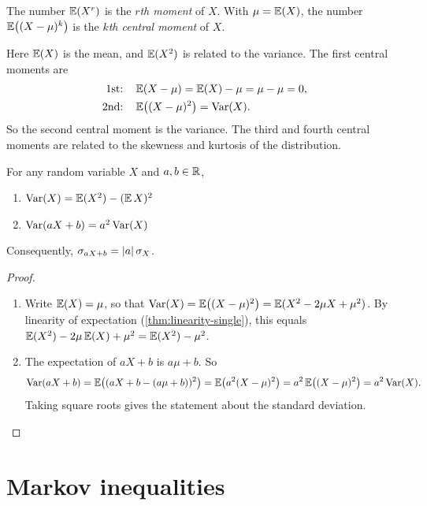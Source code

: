 \begin{definition}[Moments]\label{def:moments}
The number $\operatorname{\mathbb{E}}(X^r)$ is the \emph{$r$th moment} of $X$. With $\mu = \operatorname{\mathbb{E}}(X)$, the number $\operatorname{\mathbb{E}}\bigl((X - \mu)^k\bigr)$ is the \emph{$k$th central moment} of $X$.
\end{definition}

Here $\operatorname{\mathbb{E}}(X)$ is the mean, and $\operatorname{\mathbb{E}}(X^2)$ is related to the variance. The first central moments are
\begin{align*}
  \text{1st:} \quad & \operatorname{\mathbb{E}}(X - \mu) = \operatorname{\mathbb{E}}(X) - \mu = \mu - \mu = 0, \\
  \text{2nd:} \quad & \operatorname{\mathbb{E}}\bigl((X - \mu)^2\bigr) = \operatorname{Var}(X).
\end{align*}
So the second central moment is the variance. The third and fourth central moments are related to the skewness and kurtosis of the distribution.

\begin{theorem}\label{thm:variance-properties}
For any random variable $X$ and $a, b \in \mathbb{R}$,
\begin{enumerate}
  \item $\operatorname{Var}(X) = \operatorname{\mathbb{E}}(X^2) - (\operatorname{\mathbb{E}} X)^2$
  \item $\operatorname{Var}(aX + b) = a^2 \operatorname{Var}(X)$
\end{enumerate}
Consequently, $\sigma_{aX + b} = \lvert a\rvert\,\sigma_X$.
\end{theorem}

\begin{proof}\leavevmode
\begin{enumerate}[leftmargin=*]
  \item[1.] Write $\operatorname{\mathbb{E}}(X) = \mu$, so that $\operatorname{Var}(X) = \operatorname{\mathbb{E}}\bigl((X - \mu)^2\bigr) = \operatorname{\mathbb{E}}(X^2 - 2\mu X + \mu^2)$. By linearity of expectation (\cref{thm:linearity-single}), this equals $\operatorname{\mathbb{E}}(X^2) - 2\mu \operatorname{\mathbb{E}}(X) + \mu^2 = \operatorname{\mathbb{E}}(X^2) - \mu^2$.
  \item[2.] The expectation of $aX + b$ is $a\mu + b$. So
\[
  \operatorname{Var}(aX + b) = \operatorname{\mathbb{E}}\bigl((aX + b - (a\mu + b))^2\bigr) = \operatorname{\mathbb{E}}\bigl(a^2 (X - \mu)^2\bigr) = a^2 \operatorname{\mathbb{E}}\bigl((X - \mu)^2\bigr) = a^2 \operatorname{Var}(X).
\]
Taking square roots gives the statement about the standard deviation. \qedhere
\end{enumerate}
\end{proof}

\section{Markov inequalities}\label{sec:markov-chebyshev}

